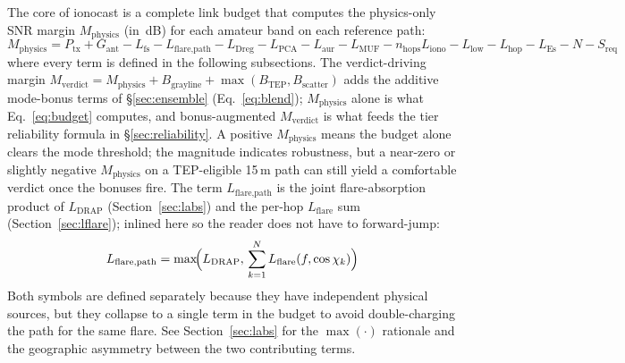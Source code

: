 \documentclass[11pt,a4paper]{article}
\begin{document}
The core of ionocast is a complete link budget that computes the
physics-only SNR margin $M_{\text{physics}}$ (in~dB) for each
amateur band on each reference path:
\begin{equation}\label{eq:budget}
  M_{\text{physics}} = P_{\text{tx}} + G_{\text{ant}}
    - L_{\text{fs}} - L_{\text{flare,path}} - L_{\text{Dreg}}
    - L_{\text{PCA}} - L_{\text{aur}}
    - L_{\text{MUF}} - n_{\text{hops}} L_{\text{iono}}
    - L_{\text{low}} - L_{\text{hop}} - L_{\text{Es}}
    - N - S_{\text{req}}
\end{equation}
where every term is defined in the following subsections.  The
verdict-driving margin $M_{\text{verdict}} = M_{\text{physics}} +
B_{\text{grayline}} + \max(B_{\text{TEP}}, B_{\text{scatter}})$
adds the additive mode-bonus terms of \S\ref{sec:ensemble}
(Eq.~\ref{eq:blend}); $M_{\text{physics}}$ alone is what
Eq.~\ref{eq:budget} computes, and bonus-augmented
$M_{\text{verdict}}$ is what feeds the tier reliability
formula in \S\ref{sec:reliability}.  A positive $M_{\text{physics}}$
means the budget alone clears the mode threshold; the magnitude
indicates robustness, but a near-zero or slightly negative
$M_{\text{physics}}$ on a TEP-eligible 15\,m path can still
yield a comfortable verdict once the bonuses fire.  The term
$L_{\text{flare,path}}$ is the joint flare-absorption product of
$L_{\text{DRAP}}$ (Section~\ref{sec:labs}) and the per-hop
$L_{\text{flare}}$ sum (Section~\ref{sec:lflare}); inlined here
so the reader does not have to forward-jump:
\begin{equation}\label{eq:flareabs-inline}
  L_{\text{flare,path}}
    = \max\!\Bigl(L_{\text{DRAP}},\,
        \sum_{k=1}^{N} L_{\text{flare}}(f, \cos\chi_k)\Bigr)
\end{equation}
Both symbols are defined separately because they have independent
physical sources, but they collapse to a single term in the budget
to avoid double-charging the path for the same flare.  See
Section~\ref{sec:labs} for the $\max(\cdot)$ rationale and the
geographic asymmetry between the two contributing terms.
\end{document}
